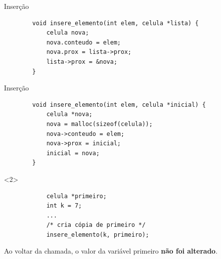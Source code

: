 \documentclass{beamer}
\begin{document}
\begin{frame}[fragile]{Inserção}

    \begin{verbatim}
        void insere_elemento(int elem, celula *lista) {
            celula nova;
            nova.conteudo = elem;
            nova.prox = lista->prox;
            lista->prox = &nova;
        }
    \end{verbatim}


\end{frame}

\begin{frame}[fragile]{Inserção}

    \begin{verbatim}
        void insere_elemento(int elem, celula *inicial) {
            celula *nova;
            nova = malloc(sizeof(celula));
            nova->conteudo = elem;
            nova->prox = inicial;
            inicial = nova;
        }
    \end{verbatim}

    \begin{onlyenv}<2>
        \begin{verbatim}
            celula *primeiro;
            int k = 7;
            ...
            /* cria cópia de primeiro */
            insere_elemento(k, primeiro);
        \end{verbatim}

        Ao voltar da chamada, o valor da variável primeiro \textbf{não foi alterado}.
    \end{onlyenv}

\end{frame}
\end{document}
